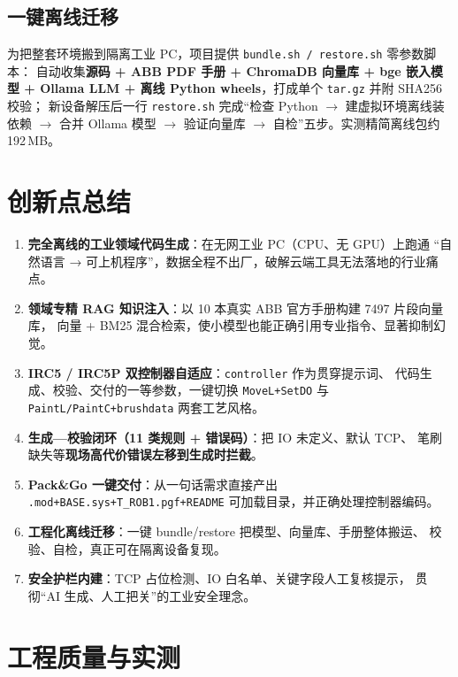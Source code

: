\documentclass[12pt,a4paper,fontset=none]{ctexart}
\begin{document}
\subsection{一键离线迁移}
为把整套环境搬到隔离工业 PC，项目提供 \texttt{bundle.sh / restore.sh} 零参数脚本：
自动收集\textbf{源码 + ABB PDF 手册 + ChromaDB 向量库 + bge 嵌入模型 + Ollama LLM +
离线 Python wheels}，打成单个 \texttt{tar.gz} 并附 SHA256 校验；
新设备解压后一行 \texttt{restore.sh} 完成“检查 Python $\to$ 建虚拟环境离线装依赖 $\to$
合并 Ollama 模型 $\to$ 验证向量库 $\to$ 自检”五步。实测精简离线包约 192\,MB。

\section{创新点总结}

\begin{enumerate}
  \item \textbf{完全离线的工业领域代码生成}：在无网工业 PC（CPU、无 GPU）上跑通
        “自然语言 → 可上机程序”，数据全程不出厂，破解云端工具无法落地的行业痛点。
  \item \textbf{领域专精 RAG 知识注入}：以 10 本真实 ABB 官方手册构建 7497 片段向量库，
        向量 + BM25 混合检索，使小模型也能正确引用专业指令、显著抑制幻觉。
  \item \textbf{IRC5 / IRC5P 双控制器自适应}：\texttt{controller} 作为贯穿提示词、
        代码生成、校验、交付的一等参数，一键切换 \texttt{MoveL+SetDO} 与
        \texttt{PaintL/PaintC+brushdata} 两套工艺风格。
  \item \textbf{生成—校验闭环（11 类规则 + 错误码）}：把 IO 未定义、默认 TCP、
        笔刷缺失等\textbf{现场高代价错误左移到生成时拦截}。
  \item \textbf{Pack\&Go 一键交付}：从一句话需求直接产出
        \texttt{.mod+BASE.sys+T\_ROB1.pgf+README} 可加载目录，并正确处理控制器编码。
  \item \textbf{工程化离线迁移}：一键 bundle/restore 把模型、向量库、手册整体搬运、
        校验、自检，真正可在隔离设备复现。
  \item \textbf{安全护栏内建}：TCP 占位检测、IO 白名单、关键字段人工复核提示，
        贯彻“AI 生成、人工把关”的工业安全理念。
\end{enumerate}

\section{工程质量与实测}\label{sec:quality}
\end{document}
